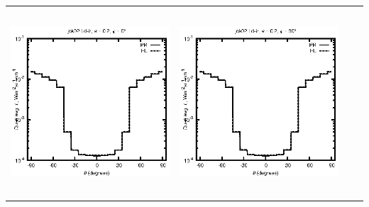 \begin{tabular}{c c c c}
\includegraphics[height=7cm]{../eps/jok02_Ld_ir_fwd.eps} &
\includegraphics[height=7cm]{../eps/jok02_Ld_ir_cross.eps} \\
\end{tabular}

\pagebreak

